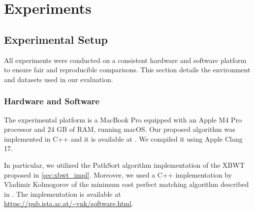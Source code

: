 \chapter{Experiments} \label{chp:experiments}

\section{Experimental Setup}
All experiments were conducted on a consistent hardware and software platform to ensure fair and reproducible comparisons. This section details the environment and datasets used in our evaluation.

\subsection{Hardware and Software}
The experimental platform is a MacBook Pro equipped with an Apple M4 Pro processor and 24 GB of RAM, running macOS. Our proposed algorithm was implemented in C++ and it is available at \url{}. We compiled it using Apple Clang 17. 

In particular, we utilized the PathSort algorithm implementation of the XBWT proposed in \cref{sec:xbwt_impl}. Moreover, we used a C++ implementation by Vladimir Kolmogorov of the minimum cost perfect matching algorithm described in \cite{kolmogorovBlossomNewImplementation2009}. The implementation is available at \url{https://pub.ista.ac.at/~vnk/software.html}.

